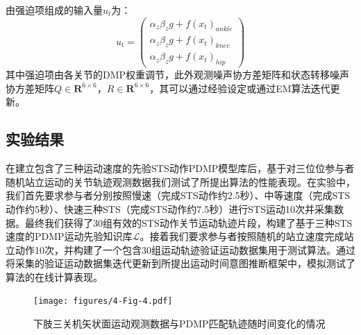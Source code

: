 由强迫项组成的输入量$u_t$为：
\begin{equation}
    u_t=\left(\begin{array}{l}
        \alpha_z \beta_z g+ f\left(x_t\right)_{ankle}\\
        \alpha_z \beta_z g+ f\left(x_t\right)_{knee}\\
        \alpha_z \beta_z g+ f\left(x_t\right)_{hip}
    \end{array}\right)
\end{equation}
其中强迫项由各关节的DMP权重调节，此外观测噪声协方差矩阵和状态转移噪声协方差矩阵$Q\in \mathbf{R}^{6 \times 6}$，$R\in \mathbf{R}^{6 \times 6}$，其可以通过经验设定或通过EM算法迭代更新\cite{bishopPatternRecognitionMachine2006}。

\subsection{实验结果} 
在建立包含了三种运动速度的先验STS动作PDMP模型库后，基于对三位位参与者随机站立运动的关节轨迹观测数据我们测试了所提出算法的性能表现。在实验中，我们首先要求参与者分别按照慢速（完成STS动作约2.5秒）、中等速度（完成STS动作约5秒）、快速三种STS（完成STS动作约7.5秒）进行STS运动10次并采集数据。最终我们获得了30组有效的STS动作关节运动轨迹片段，构建了基于三种STS速度的PDMP运动先验知识库$\mathscr{L}$。接着我们要求参与者按照随机的站立速度完成站立动作10次，并构建了一个包含30组运动轨迹验证运动数据集用于测试算法。通过将采集的验证运动数据集迭代更新到所提出运动时间意图推断框架中，模拟测试了算法的在线计算表现。


\begin{figure}[!t]
    \centering
    {
        \begin{minipage}{9.5in}
            \centering
            \texttt{[image: figures/4-Fig-4.pdf]}
            \caption{下肢三关机矢状面运动观测数据与PDMP匹配轨迹随时间变化的情况}
        \label{fig:4-4}
        \end{minipage}
    }
\end{figure}

